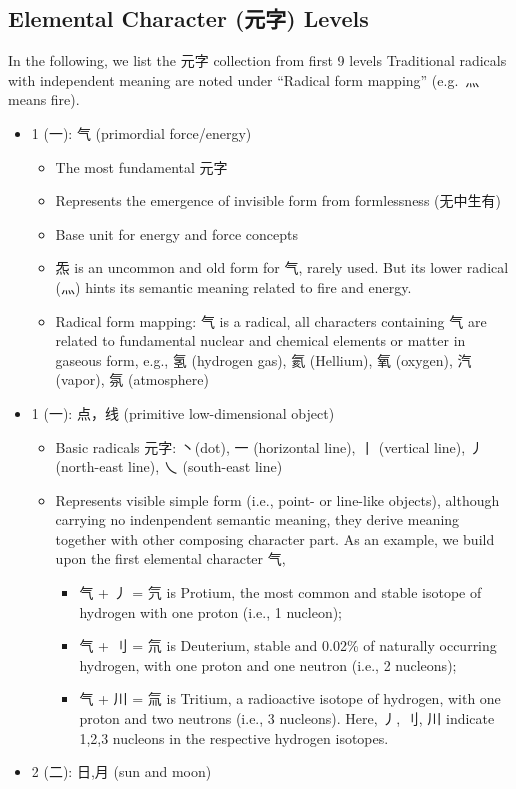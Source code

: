\documentclass[11pt,letterpaper]{article}
\begin{document}
\subsection{Elemental Character (元字) Levels}\label{elemental-character-ux5143ux5b57-levels}

In the following, we list the 元字 collection from first 9 levels
Traditional radicals with independent meaning are noted under ``Radical
form mapping'' (e.g.~灬 means fire).

\begin{itemize}
\tightlist
\item
  1 (一): 气 (primordial force/energy)

  \begin{itemize}
  \tightlist
  \item
    The most fundamental 元字
  \item
    Represents the emergence of invisible form from formlessness
    (无中生有)
  \item
    Base unit for energy and force concepts
  \item
    炁 is an uncommon and old form for 气, rarely used. But its lower
    radical (灬) hints its semantic meaning related to fire and energy.
  \item
    Radical form mapping: 气 is a radical, all characters containing 气
    are related to fundamental nuclear and chemical elements or matter
    in gaseous form, e.g., 氢 (hydrogen gas), 氦 (Hellium), 氧 (oxygen),
    汽 (vapor), 氛 (atmosphere)
  \end{itemize}
\item
  1 (一): 点，线 (primitive low-dimensional object)

  \begin{itemize}
  \tightlist
  \item
    Basic radicals 元字: 丶(dot), 一 (horizontal line), 丨 (vertical
    line), 丿 (north-east line), 乀 (south-east line)
  \item
    Represents visible simple form (i.e., point- or line-like objects),
    although carrying no indenpendent semantic meaning, they derive
    meaning together with other composing character part. As an example,
    we build upon the first elemental character 气,

    \begin{itemize}
    \tightlist
    \item
      气 + 丿 = 氕 is Protium, the most common and stable isotope of
      hydrogen with one proton (i.e., 1 nucleon);
    \item
      气 + 刂 = 氘 is Deuterium, stable and 0.02\% of naturally
      occurring hydrogen, with one proton and one neutron (i.e., 2
      nucleons);
    \item
      气 + 川 = 氚 is Tritium, a radioactive isotope of hydrogen, with
      one proton and two neutrons (i.e., 3 nucleons). Here, 丿, 刂, 川
      indicate 1,2,3 nucleons in the respective hydrogen isotopes.
    \end{itemize}
  \end{itemize}
\item
  2 (二): 日,月 (sun and moon)


\end{itemize}
\end{document}
